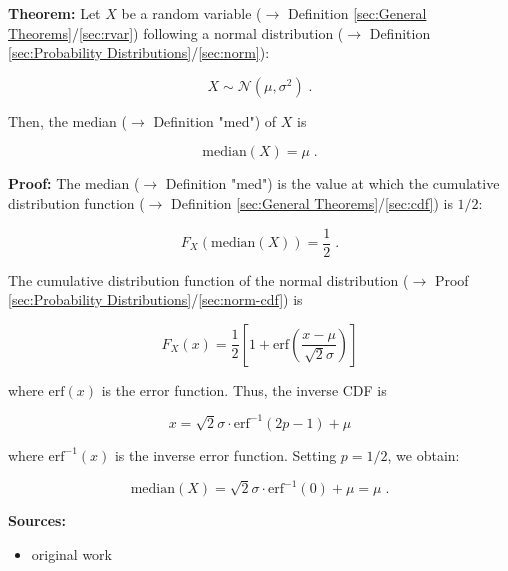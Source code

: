 \documentclass[a4paper,12pt,twoside]{book}
\begin{document}
\textbf{Theorem:} Let $X$ be a random variable ($\rightarrow$ Definition \ref{sec:General Theorems}/\ref{sec:rvar}) following a normal distribution ($\rightarrow$ Definition \ref{sec:Probability Distributions}/\ref{sec:norm}):

\begin{equation} \label{eq:norm-med-norm}
X \sim \mathcal{N}(\mu, \sigma^2) \; .
\end{equation}

Then, the median ($\rightarrow$ Definition "med") of $X$ is

\begin{equation} \label{eq:norm-med-norm-median}
\mathrm{median}(X) = \mu \; .
\end{equation}


\vspace{1em}
\textbf{Proof:} The median ($\rightarrow$ Definition "med") is the value at which the cumulative distribution function ($\rightarrow$ Definition \ref{sec:General Theorems}/\ref{sec:cdf}) is $1/2$:

\begin{equation} \label{eq:norm-med-median}
F_X(\mathrm{median}(X)) = \frac{1}{2} \; .
\end{equation}

The cumulative distribution function of the normal distribution ($\rightarrow$ Proof \ref{sec:Probability Distributions}/\ref{sec:norm-cdf}) is

\begin{equation} \label{eq:norm-med-norm-cdf}
F_X(x) = \frac{1}{2} \left[ 1 + \mathrm{erf} \left( \frac{x-\mu}{\sqrt{2}\sigma} \right) \right]
\end{equation}

where $\mathrm{erf}(x)$ is the error function. Thus, the inverse CDF is

\begin{equation} \label{eq:norm-med-norm-cdf-inv}
x = \sqrt{2}\sigma \cdot \mathrm{erf}^{-1}(2p-1) + \mu
\end{equation}

where $\mathrm{erf}^{-1}(x)$ is the inverse error function. Setting $p = 1/2$, we obtain:

\begin{equation} \label{eq:norm-med-norm-med-qed}
\mathrm{median}(X) = \sqrt{2}\sigma \cdot \mathrm{erf}^{-1}(0) + \mu = \mu \; .
\end{equation}


\vspace{1em}
\textbf{Sources:}
\begin{itemize}
\item original work\end{itemize}
\end{document}
